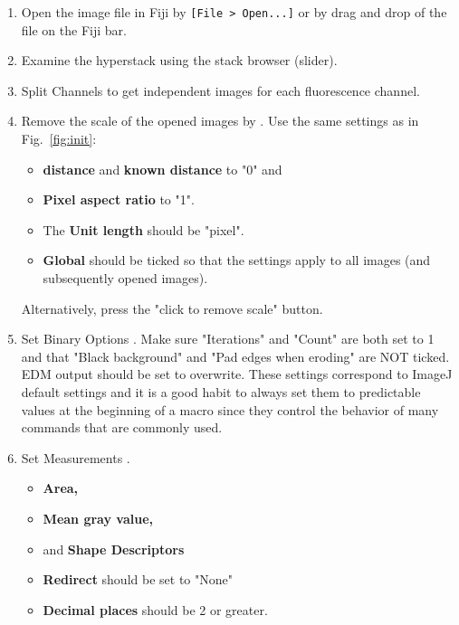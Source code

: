 \begin{enumerate}
    \item Open the image file in Fiji by
    \texttt{[File > Open...]} or by drag and drop of the file on the Fiji bar.
    
    \item Examine the hyperstack using the stack browser (slider).
    
    \item Split Channels to get independent images for each fluorescence channel.
    \item Remove the scale of the opened images by 
        . 
        Use the same settings as in Fig.~\ref{fig:init}:

        \begin{itemize}
            \item\textbf{distance} and \textbf{known distance} to "0" and  
            \item\textbf{Pixel aspect ratio} to "1".  
            \item The \textbf{Unit length} should be "pixel". 
            \item  \textbf{Global} should be ticked so that the settings apply to all images (and subsequently opened images).

        \end{itemize}

        Alternatively, press the "click to remove scale" button. 
    
    \item Set Binary Options 
        .
    Make sure "Iterations" and "Count" are both set to 1 and that "Black background" and "Pad edges when eroding" are NOT ticked. EDM output should be set to overwrite. These settings correspond to ImageJ default settings and it is a good habit to always set them to predictable values at the beginning of a macro since they control the behavior of many commands that are commonly used. 
    
    \item Set Measurements 
        .

    \begin{itemize}
        \item\textbf{Area,} 
        \item\textbf{Mean gray value,} 
        \item and \textbf{Shape Descriptors} 
        
        \item\textbf{Redirect} should be set to "None" 
        \item\textbf{Decimal places} should be 2 or greater.  
    
    \end{itemize}
\end{enumerate}    